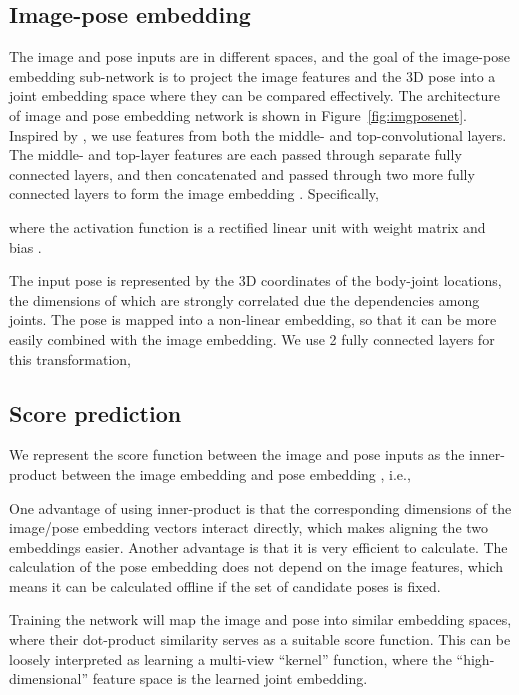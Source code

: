 \documentclass[10pt,twocolumn,letterpaper]{article}
\begin{document}
\subsection{Image-pose embedding}
\label{sub:imagepose}
\vspace{-0.05in}
The image and pose inputs are in different spaces, and
the goal of the image-pose embedding sub-network is to project the image features and the 3D pose into a joint embedding space where they can be compared effectively.
The architecture of image and pose embedding network is shown in Figure~\ref{fig:imgposenet}. 
Inspired by \cite{Sun2014dlface,hmlpeijcv}, we use features from both the middle- and top-convolutional layers.
The middle- and top-layer features are each passed through separate fully connected layers, and then concatenated and passed through two more fully connected layers to form the image embedding .
Specifically,
 
where the activation function  is a rectified linear unit with  weight matrix  and bias .

The input pose  is represented by the 3D coordinates of the body-joint locations, 
the dimensions of which are strongly correlated due the dependencies among joints. 
The pose is mapped into a non-linear embedding, so that it can be more easily combined with the image embedding.
We use 2 fully connected layers for this transformation,



 


\subsection{Score prediction}
We represent the score function between the image and pose inputs  as the inner-product between the image embedding  and pose embedding , i.e., 
 
One advantage of using inner-product is that the corresponding dimensions of the image/pose embedding vectors interact directly, which makes aligning the two embeddings easier.
Another advantage is that it is very efficient to calculate.
The calculation of the pose embedding does not depend on the image features, which means it can be calculated offline if the set of candidate poses is fixed. 


Training the network will map the image and pose into similar embedding spaces, where their dot-product similarity serves as a suitable score function. This can be loosely interpreted as learning a multi-view ``kernel'' function, where the ``high-dimensional'' feature space is the learned joint embedding.
\end{document}

